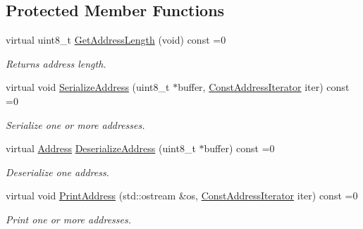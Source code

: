 \subsection*{Protected Member Functions}
\begin{DoxyCompactItemize}
\item 
virtual uint8\+\_\+t \hyperlink{classns3_1_1PbbAddressBlock_a0b96213a92a072027cc96a2e41c8eb24}{Get\+Address\+Length} (void) const =0
\begin{DoxyCompactList}\small\item\em Returns address length. \end{DoxyCompactList}\item 
virtual void \hyperlink{classns3_1_1PbbAddressBlock_a53207832167cad2ee8a7783f318c44aa}{Serialize\+Address} (uint8\+\_\+t $\ast$buffer, \hyperlink{classns3_1_1PbbAddressBlock_ac1f10df8f85c0c8d4b729352bc32a7cf}{Const\+Address\+Iterator} iter) const =0
\begin{DoxyCompactList}\small\item\em Serialize one or more addresses. \end{DoxyCompactList}\item 
virtual \hyperlink{classns3_1_1Address}{Address} \hyperlink{classns3_1_1PbbAddressBlock_aa9ca0f598c59a9357ae39d403a3d8ad0}{Deserialize\+Address} (uint8\+\_\+t $\ast$buffer) const =0
\begin{DoxyCompactList}\small\item\em Deserialize one address. \end{DoxyCompactList}\item 
virtual void \hyperlink{classns3_1_1PbbAddressBlock_a46d232de8e7db3ba865947c49cb703d1}{Print\+Address} (std\+::ostream \&os, \hyperlink{classns3_1_1PbbAddressBlock_ac1f10df8f85c0c8d4b729352bc32a7cf}{Const\+Address\+Iterator} iter) const =0
\begin{DoxyCompactList}\small\item\em Print one or more addresses. \end{DoxyCompactList}\end{DoxyCompactItemize}
